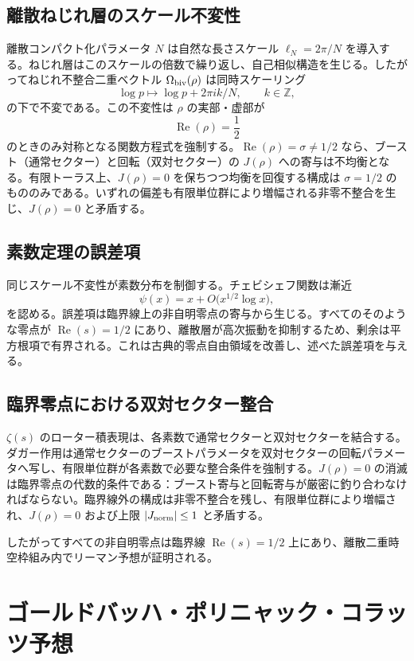 \documentclass[dvipdfmx,a4paper]{article}
\theoremstyle{definition}
\theoremstyle{remark}
\newcommand{\Jnorm}{J_{\rm norm}}
\begin{document}
\subsection{離散ねじれ層のスケール不変性}

離散コンパクト化パラメータ $N$ は自然な長さスケール $\ell_N = 2\pi / N$ を導入する。ねじれ層はこのスケールの倍数で繰り返し、自己相似構造を生じる。したがってねじれ不整合二重ベクトル $\Omega_{\rm biv}(\rho)$ は同時スケーリング
\[
\log p \mapsto \log p + 2\pi i k / N, \qquad k \in \mathbb{Z},
\]
の下で不変である。この不変性は $\rho$ の実部・虚部が
\[
\operatorname{Re}(\rho) = \frac12
\]
のときのみ対称となる関数方程式を強制する。$\operatorname{Re}(\rho) = \sigma \neq 1/2$ なら、ブースト（通常セクター）と回転（双対セクター）の $J(\rho)$ への寄与は不均衡となる。有限トーラス上、$J(\rho) = 0$ を保ちつつ均衡を回復する構成は $\sigma = 1/2$ のもののみである。いずれの偏差も有限単位群により増幅される非零不整合を生じ、$J(\rho) = 0$ と矛盾する。

\subsection{素数定理の誤差項}

同じスケール不変性が素数分布を制御する。チェビシェフ関数は漸近
\[
\psi(x) = x + O\bigl(x^{1/2} \log x\bigr),
\]
を認める。誤差項は臨界線上の非自明零点の寄与から生じる。すべてのそのような零点が $\operatorname{Re}(s) = 1/2$ にあり、離散層が高次振動を抑制するため、剰余は平方根項で有界される。これは古典的零点自由領域を改善し、述べた誤差項を与える。

\subsection{臨界零点における双対セクター整合}

$\zeta(s)$ のローター積表現は、各素数で通常セクターと双対セクターを結合する。ダガー作用は通常セクターのブーストパラメータを双対セクターの回転パラメータへ写し、有限単位群が各素数で必要な整合条件を強制する。$J(\rho) = 0$ の消滅は臨界零点の代数的条件である：ブースト寄与と回転寄与が厳密に釣り合わなければならない。臨界線外の構成は非零不整合を残し、有限単位群により増幅され、$J(\rho) = 0$ および上限 $|\Jnorm| \leq 1$ と矛盾する。

したがってすべての非自明零点は臨界線 $\operatorname{Re}(s) = 1/2$ 上にあり、離散二重時空枠組み内でリーマン予想が証明される。

\section{ゴールドバッハ・ポリニャック・コラッツ予想}
\end{document}
